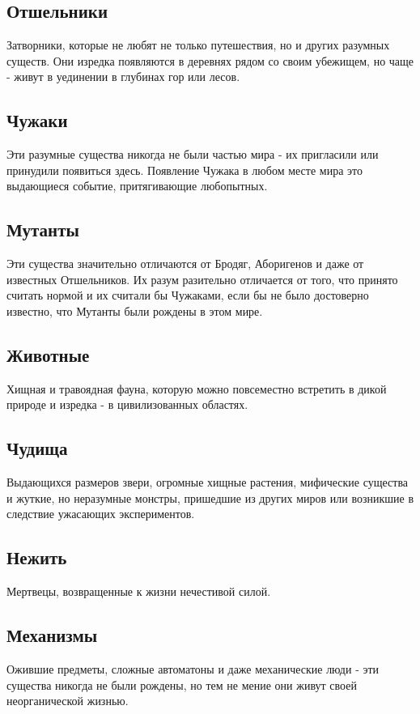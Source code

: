 \subsection{Отшельники}
Затворники, которые не любят не только путешествия, но и других разумных существ. Они изредка появляются в деревнях рядом со своим убежищем, но чаще - живут в уединении в глубинах гор или лесов.

\subsection{Чужаки}
Эти разумные существа никогда не были частью мира - их пригласили или принудили появиться здесь. Появление Чужака в любом месте мира это выдающиеся событие, притягивающие любопытных.

\subsection{Мутанты}
Эти существа значительно отличаются от Бродяг, Аборигенов и даже от известных Отшельников. Их разум разительно отличается от того, что принято считать нормой и их считали бы Чужаками, если бы не было достоверно известно, что Мутанты были рождены в этом мире.

\subsection{Животные}
Хищная и травоядная фауна, которую можно повсеместно встретить в дикой природе и изредка - в цивилизованных областях.

\subsection{Чудища}
Выдающихся размеров звери, огромные хищные растения, мифические существа и жуткие, но неразумные монстры, пришедшие из других миров или возникшие в следствие ужасающих экспериментов.

\subsection{Нежить}
Мертвецы, возвращенные к жизни нечестивой силой.

\subsection{Механизмы}
Ожившие предметы, сложные автоматоны и даже механические люди - эти существа никогда не были рождены, но тем не мение они живут своей неорганической жизнью.

